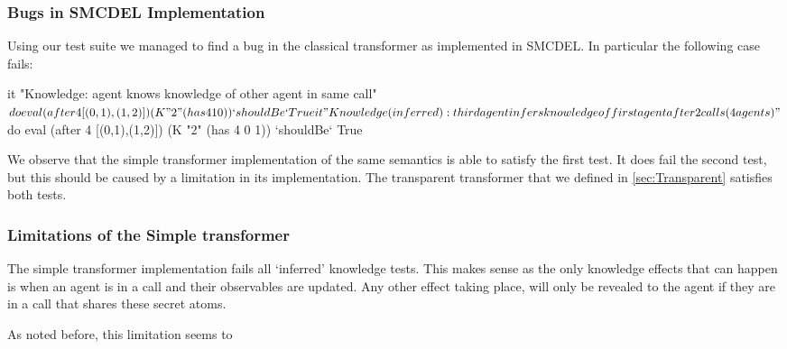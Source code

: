 \subsubsection{Bugs in SMCDEL Implementation}
Using our test suite we managed to find a bug in the classical transformer as implemented in SMCDEL. In particular the following case fails:
\begin{showCode}
    it "Knowledge: agent knows knowledge of other agent in same call" $ do
    eval (after 4 [(0,1),(1,2)]) (K "2" (has 4 1 0)) `shouldBe` True
    it "Knowledge (inferred): third agent infers knowledge of first agent after 2 calls (4 agents)" $ do
    eval (after 4 [(0,1),(1,2)]) (K "2" (has 4 0 1)) `shouldBe` True
\end{showCode}
We observe that the simple transformer implementation of the same semantics is able to satisfy the first test.
It does fail the second test, but this should be caused by a limitation in its implementation.
The transparent transformer that we defined in \ref{sec:Transparent} satisfies both tests.

\subsubsection{Limitations of the Simple transformer}
The simple transformer implementation fails all `inferred' knowledge tests.
This makes sense as the only knowledge effects that can happen is when an agent is in a call and their observables are updated.
Any other effect taking place, will only be revealed to the agent if they are in a call that shares these secret atoms.

As noted before, this limitation seems to
